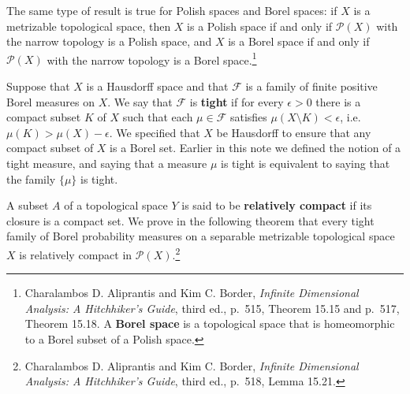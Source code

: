 \documentclass{article}
\theoremstyle{definition}
\theoremstyle{definition}
\begin{document}
The same type of result is true for Polish spaces and Borel spaces: if $X$ is a metrizable topological
space, then $X$ is a Polish space if and only if $\mathscr{P}(X)$ with the narrow topology is  a Polish space, and $X$ is a Borel space if and only if
$\mathscr{P}(X)$ with the narrow topology is a Borel space.\footnote{Charalambos D. 
Aliprantis and Kim C. Border, {\em Infinite Dimensional Analysis: A Hitchhiker's Guide}, third ed., p.~515, Theorem 15.15 and
p.~517, Theorem 15.18. A \textbf{Borel space} is a  topological space that is homeomorphic
to a Borel subset of a Polish space.}

Suppose that $X$ is a Hausdorff  space and that
$\mathscr{F}$ is a family of finite positive Borel measures on $X$. We say that $\mathscr{F}$ is \textbf{tight} if
for every $\epsilon>0$ there is a compact subset $K$ of $X$ such that each $\mu \in \mathscr{F}$ satisfies
$\mu(X \setminus K) < \epsilon$, i.e. $\mu(K)>\mu(X)-\epsilon$. We specified that $X$ be Hausdorff to ensure that any compact subset of $X$ is a Borel set.
Earlier in this note we defined the notion of a tight measure, and saying that a measure $\mu$ is tight is equivalent to saying that the family 
$\{\mu\}$ is tight.

A subset $A$ of a topological space $Y$ is said to be \textbf{relatively compact} if its closure is a compact set. We prove
in the following theorem that
every tight family of Borel probability measures on a separable metrizable topological space $X$ is relatively compact in
$\mathscr{P}(X)$.\footnote{Charalambos D. 
Aliprantis and Kim C. Border, {\em Infinite Dimensional Analysis: A Hitchhiker's Guide}, third ed., p.~518, Lemma 15.21.}
\end{document}
